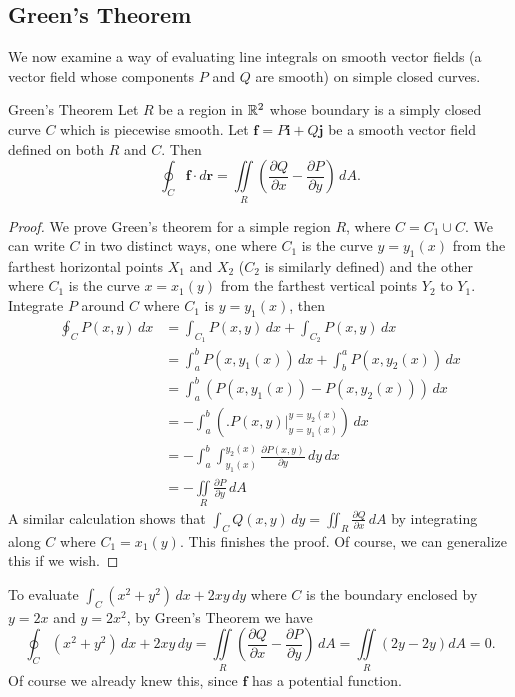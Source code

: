 \subsection{Green's Theorem}
We now examine a way of evaluating line integrals on smooth vector fields (a vector field whose components $P$ and $Q$ are smooth) on simple closed curves.
\begin{namedthm}{Green's Theorem}
    Let $R$ be a region in $\mathbb{R}^2$ whose boundary is a simply closed curve $C$ which is piecewise smooth. Let $\mathbf f=P \mathbf i +Q \mathbf j$ be a smooth vector field defined on both $R$ and $C$. Then \[
        \oint_{C}^{} \mathbf f \cdot d \mathbf r= \iint\limits_R\left( \frac{\partial Q}{\partial x}-\frac{\partial P}{\partial y} \right)  \, dA.
    \]  
\end{namedthm}
\begin{proof}
    We prove Green's theorem for a simple region $R$, where $C=C_1\cup C$. We can write $C$ in two distinct ways, one where $C_1$ is the curve $y=y_1(x)$ from the farthest horizontal points $X_1$ and $X_2$ ($C_2$ is similarly defined) and the other where $C_1$ is the curve $x=x_1(y)$ from the farthest vertical points $Y_2$ to $Y_1$. Integrate $P$ around $C $ where $C_1$ is $y=y_1(x)$, then 
    \begin{align*}
        \oint_{C}^{} P(x,y) \, dx&= \int_{C_1}^{} P(x,y) \, dx+ \int_{C_2}^{} P(x,y) \, dx\\
                                 &=\int_{a}^{b} P(x,y_1(x)) \, dx+\int_{b}^{a} P(x,y_2(x)) \, dx\\
                                 &=\int_{a}^{b} (P(x,y_1(x))-P(x,y_2(x)))\,dx \\
                                 &=-\int_{a}^{b} \left( \Big. P(x,y) \Big|_{y=y_1(x)}^{y=y_2(x)}  \right)  \, dx\\
                                 &=-\int_{a}^{b} \int_{y_1(x)}^{y_2(x)} \frac{\partial  P(x,y)}{\partial y} \, dy \, dx\\
                                 &=-\iint\limits_R \frac{\partial P}{\partial y} \, dA
    \end{align*}A similar calculation shows that $\int_{C}^{} Q(x,y) \, dy=\iint_R\frac{\partial Q}{\partial x}\,dA$ by integrating along $C$ where $C_1=x_1(y)$. This finishes the proof. Of course, we can generalize this if we wish.
\end{proof}
\begin{example}
    To evaluate $\int_{C}^{} (x^2+y^2) \, dx+2xy\, dy$ where $C$ is the boundary enclosed by $y=2x$ and $y=2x^2$, by Green's Theorem we have \[
        \oint_{C}^{} (x^2+y^2) \, dx+2xy\,dy=\iint\limits_R \left( \frac{\partial Q}{\partial x}-\frac{\partial P}{\partial y} \right) \,dA=\iint\limits_R (2y-2y)dA=0.
    \] Of course we already knew this, since $\mathbf f$ has a potential function.
\end{example}
